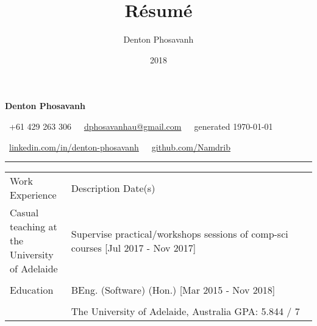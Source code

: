 \documentclass[a4paper]{article}
\title{R\'{e}sum\'{e}}
\author{Denton Phosavanh}
\date{2018}
\begin{document}
	\centering %
	{\LARGE \textbf{Denton Phosavanh}}

	\faMobilePhone\ +61 429 263 306\ \ \faInbox\ \href{mailto:dphosavanhau@gmail.com}{dphosavanhau@gmail.com}\ \ \faCalendar\ generated \today

	\faLinkedinSign\ \href{https://www.linkedin.com/in/denton-phosavanh}{linkedin.com/in/denton-phosavanh}\ \ \faGithub\ \href{https://www.github.com/Namdrib}{github.com/Namdrib}
	\hrule
	\vspace{10px}


	\centering
	\begin{tabu} to 
		\rowfont{\bfseries\large} Work Experience & Description \hfill Date(s) \\
		Casual teaching at the University of Adelaide & Supervise practical/workshops sessions of comp-sci courses \hfill [Jul 2017 - Nov 2017] \\

		& \\
		\rowfont{\bfseries\large} Education & BEng. (Software) (Hon.) \hfill [Mar 2015 - Nov 2018] \\

		& \\
		& The University of Adelaide, Australia \hfill GPA: 5.844 / 7 \\


\end{tabu}
\end{document}
